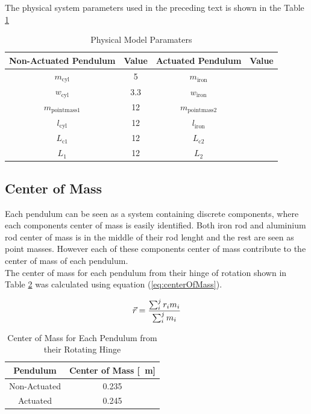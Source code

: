 The physical system parameters used in the preceding text is shown in the Table \ref{table:model_param}


\begin{table}[]
	\centering
	\begin{tabular}{|c|c|c|c|}
		\hline
		Non-Actuated Pendulum& Value & Actuated Pendulum & Value \\
		\hline
		\hline
		$m_{\text{cyl}}$ & \SI{5}{} & $m_{\text{iron}}$ &\\
		\hline
		$w_{\text{cyl}}$ & \SI{3.3}{}& $w_{\text{iron}}$& \\
		\hline
		$m_{\text{pointmass1}}$ & \SI{12}{}& $m_{\text{pointmass2}}$& \\
		\hline
		$l_{\text{cyl}}$ & \SI{12}{}& $l_{\text{iron}}$& \\
		\hline
		$L_{\text{c1}}$ & \SI{12}{} & $L_{\text{c2}}$&\\
		\hline
		$L_{1}$ & \SI{12}{}& $L_{2}$& \\
		\hline
	\end{tabular}
	\caption{Physical Model Paramaters}
	\label{table:model_param}
\end{table}

\subsection{Center of Mass}
Each pendulum can be seen as a system containing discrete components, where each components center of mass is easily identified. Both iron rod and aluminium rod center of mass is in the middle of their rod lenght and the rest are seen as point masses. However each of these components center of mass contribute to the center of mass of each pendulum.\\

The center of mass for each pendulum from their hinge of rotation shown in Table \ref{table:centerOfMass} was calculated using equation (\ref{eq:centerOfMass}).

\begin{equation} \label{eq:centerOfMass}
\vec{\boldmath{r}} = \frac{\sum_{i}^{j}r_{i}m_{i}}{\sum_{i}^{j}m_{i}}
\end{equation}

\begin{table}[]
	\centering
	\begin{tabular}{|c|c|}
		\hline
		Pendulum & Center of Mass [\SI{}{m}] \\
		\hline
		\hline
		Non-Actuated  & \SI{0.235}{} \\
		\hline
		Actuated  & \SI{0.245}{} \\
		\hline
	\end{tabular}
	\caption{Center of Mass for Each Pendulum from their Rotating Hinge}
	\label{table:centerOfMass}
\end{table}


